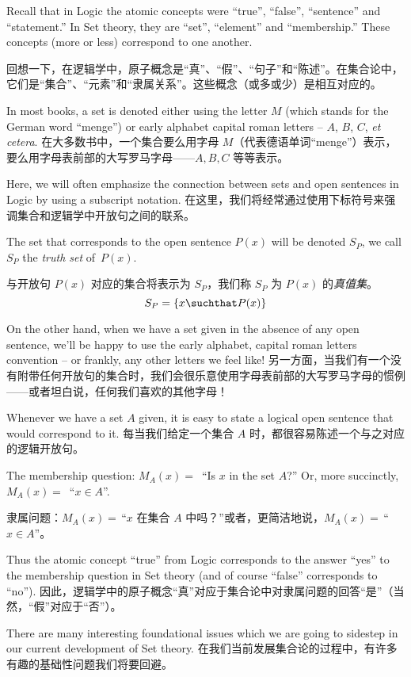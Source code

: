 Recall that in Logic the atomic concepts were ``true'', ``false'', 
``sentence'' and ``statement.''    In Set theory, they are ``set'', 
``element'' and ``membership.''  These concepts (more or less) correspond to
one another.

回想一下，在逻辑学中，原子概念是“真”、“假”、“句子”和“陈述”。在集合论中，它们是“集合”、“元素”和“隶属关系”。这些概念（或多或少）是相互对应的。

In most books, a set is denoted either using the letter $M$ 
(which stands for the German word ``menge'') or early alphabet capital roman 
letters --
$A$, $B$, $C$, \emph{et cetera}.
在大多数书中，一个集合要么用字母 $M$（代表德语单词“menge”）表示，要么用字母表前部的大写罗马字母——$A, B, C$ 等等表示。

Here, we will often emphasize the connection between
sets and open sentences in Logic by using a subscript notation.
在这里，我们将经常通过使用下标符号来强调集合和逻辑学中开放句之间的联系。

The set that
corresponds to the open sentence $P(x)$ will be denoted $S_P$, we call
$S_P$ the  \emph{truth set} of~$P(x)$.

与开放句 $P(x)$ 对应的集合将表示为 $S_P$，我们称 $S_P$ 为 $P(x)$ 的\emph{真值集}。
\[ S_P = \{ x \suchthat P(x) \} \]


On the other hand, when we have a set given in the absence of any open 
sentence, we'll be happy to use the early alphabet, capital roman letters 
convention -- or frankly, any other letters we feel like!
另一方面，当我们有一个没有附带任何开放句的集合时，我们会很乐意使用字母表前部的大写罗马字母的惯例——或者坦白说，任何我们喜欢的其他字母！

Whenever we have a set $A$ given, it is easy to state a logical 
open sentence that would correspond to it.
每当我们给定一个集合 $A$ 时，都很容易陈述一个与之对应的逻辑开放句。

The membership question: $M_A(x) =
\,$ ``Is $x$ in the set $A$?''  Or, more succinctly, 
$M_A(x) = \,$ ``$x \in A$''.

隶属问题：$M_A(x) = \,$“$x$ 在集合 $A$ 中吗？”或者，更简洁地说，$M_A(x) = \,$“$x \in A$”。

Thus the atomic concept ``true'' from Logic
corresponds to the answer ``yes'' to the membership question in Set theory
(and of course ``false'' corresponds to ``no'').
因此，逻辑学中的原子概念“真”对应于集合论中对隶属问题的回答“是”（当然，“假”对应于“否”）。

There are many interesting foundational issues which we are going to
sidestep in our current development of Set theory.
在我们当前发展集合论的过程中，有许多有趣的基础性问题我们将要回避。

